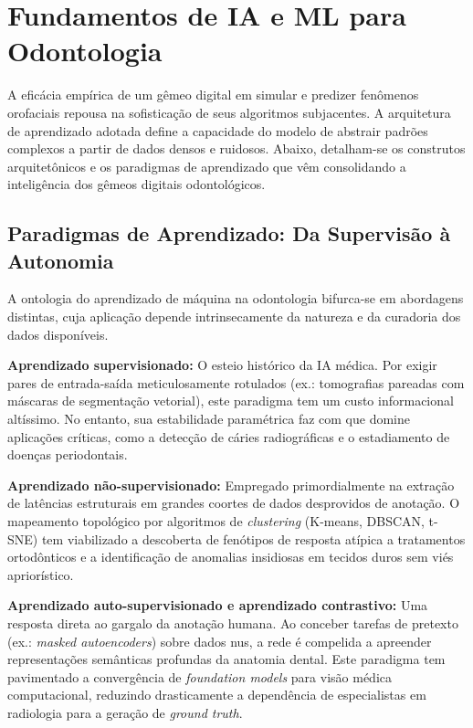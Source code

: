 \section{Fundamentos de IA e ML para Odontologia}
\label{sec:ia-fundamentos}

A eficácia empírica de um gêmeo digital em simular e predizer fenômenos orofaciais repousa na sofisticação de seus algoritmos subjacentes. A arquitetura de aprendizado adotada define a capacidade do modelo de abstrair padrões complexos a partir de dados densos e ruidosos. Abaixo, detalham-se os construtos arquitetônicos e os paradigmas de aprendizado que vêm consolidando a inteligência dos gêmeos digitais odontológicos.

\subsection{Paradigmas de Aprendizado: Da Supervisão à Autonomia}

A ontologia do aprendizado de máquina na odontologia bifurca-se em abordagens distintas, cuja aplicação depende intrinsecamente da natureza e da curadoria dos dados disponíveis.

\textbf{Aprendizado supervisionado:} O esteio histórico da IA médica. Por exigir pares de entrada-saída meticulosamente rotulados (ex.: tomografias pareadas com máscaras de segmentação vetorial), este paradigma tem um custo informacional altíssimo. No entanto, sua estabilidade paramétrica faz com que domine aplicações críticas, como a detecção de cáries radiográficas e o estadiamento de doenças periodontais.

\textbf{Aprendizado não-supervisionado:} Empregado primordialmente na extração de latências estruturais em grandes coortes de dados desprovidos de anotação. O mapeamento topológico por algoritmos de \textit{clustering} (K-means, DBSCAN, t-SNE) tem viabilizado a descoberta de fenótipos de resposta atípica a tratamentos ortodônticos e a identificação de anomalias insidiosas em tecidos duros sem viés apriorístico.

\textbf{Aprendizado auto-supervisionado e aprendizado contrastivo:} Uma resposta direta ao gargalo da anotação humana. Ao conceber tarefas de pretexto (ex.: \textit{masked autoencoders}) sobre dados nus, a rede é compelida a apreender representações semânticas profundas da anatomia dental. Este paradigma tem pavimentado a convergência de \textit{foundation models} para visão médica computacional, reduzindo drasticamente a dependência de especialistas em radiologia para a geração de \textit{ground truth}.

